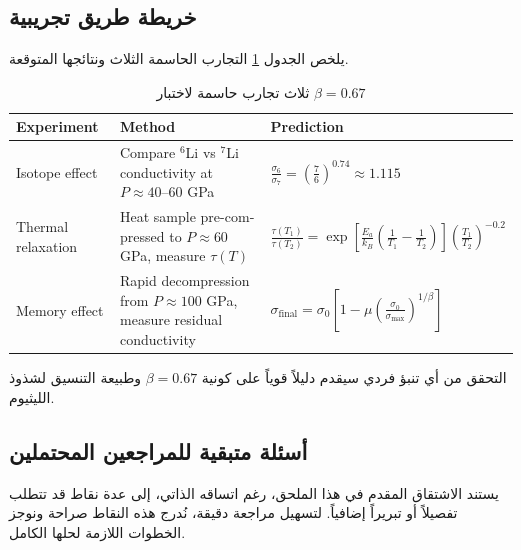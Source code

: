 \documentclass[12pt,a4paper]{article}
\theoremstyle{remark}
\begin{document}
	\subsection{خريطة طريق تجريبية}
	
	يلخص الجدول \ref{tab:experiments} التجارب الحاسمة الثلاث ونتائجها المتوقعة.
	
	\begin{otherlanguage}{english}
		\begin{table}[H]
			\centering
			\caption{ثلاث تجارب حاسمة لاختبار \(\beta = 0.67\)}
			\label{tab:experiments}
			\begin{tabular}{p{}p{}p{}}
				\toprule
				\textbf{Experiment} & \textbf{Method} & \textbf{Prediction} \\
				\midrule
				Isotope effect & Compare \(^6\)Li vs \(^7\)Li conductivity at \(P \approx 40\)–60 GPa & \(\displaystyle \frac{\sigma_6}{\sigma_7} = \left(\frac{7}{6}\right)^{0.74} \approx 1.115\) \\
				\hline
				Thermal relaxation & Heat sample pre-compressed to \(P \approx 60\) GPa, measure \(\tau(T)\) & \(\displaystyle \frac{\tau(T_1)}{\tau(T_2)} = \exp\left[\frac{E_a}{k_B}\left(\frac1{T_1}-\frac1{T_2}\right)\right] \left(\frac{T_1}{T_2}\right)^{-0.2}\) \\
				\hline
				Memory effect & Rapid decompression from \(P \approx 100\) GPa, measure residual conductivity & \(\displaystyle \sigma_{\text{final}} = \sigma_0\left[1 - \mu\left(\frac{\sigma_0}{\sigma_{\max}}\right)^{1/\beta}\right]\) \\
				\bottomrule
			\end{tabular}
		\end{table}
	\end{otherlanguage}
	
	التحقق من أي تنبؤ فردي سيقدم دليلاً قوياً على كونية \(\beta = 0.67\) وطبيعة التنسيق لشذوذ الليثيوم.
	
	\subsection{أسئلة متبقية للمراجعين المحتملين}
	\label{subsec:remaining-questions}
	
	يستند الاشتقاق المقدم في هذا الملحق، رغم اتساقه الذاتي، إلى عدة نقاط قد تتطلب تفصيلاً أو تبريراً إضافياً. لتسهيل مراجعة دقيقة، نُدرج هذه النقاط صراحة ونوجز الخطوات اللازمة لحلها الكامل.
	
\end{document}

